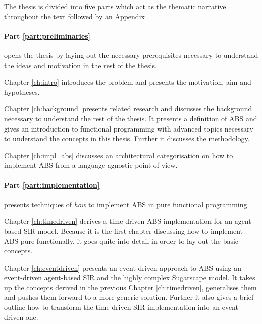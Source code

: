 The thesis is divided into five parts which act as the thematic narrative throughout the text followed by an Appendix . 

\paragraph{Part \ref{part:preliminaries}} opens the thesis by laying out the necessary prerequisites necessary to understand the ideas and motivation in the rest of the thesis.
\medskip

Chapter \ref{ch:intro} introduces the problem and presents the motivation, aim and hypotheses.

\medskip

Chapter \ref{ch:background} presents related research and discusses the background necessary to understand the rest of the thesis. It presents a definition of ABS and gives an introduction to functional programming with advanced topics necessary to understand the concepts in this thesis. Further it discusses the methodology.

\medskip

Chapter \ref{ch:impl_abs} discusses an architectural categorisation on how to implement ABS from a language-agnostic point of view. 

\medskip

\paragraph{Part \ref{part:implementation}} presents techniques of \textit{how} to implement ABS in pure functional programming. 
\medskip

Chapter \ref{ch:timedriven} derives a time-driven ABS implementation for an agent-based SIR model. Because it is the first chapter discussing how to implement ABS pure functionally, it goes quite into detail in order to lay out the basic concepts.

\medskip

Chapter \ref{ch:eventdriven} presents an event-driven approach to ABS using an event-driven agent-based SIR and the highly complex Sugarscape model. It takes up the concepts derived in the previous Chapter \ref{ch:timedriven}, generalises them and pushes them forward to a more generic solution. Further it also gives a brief outline how to transform the time-driven SIR implementation into an event-driven one.



